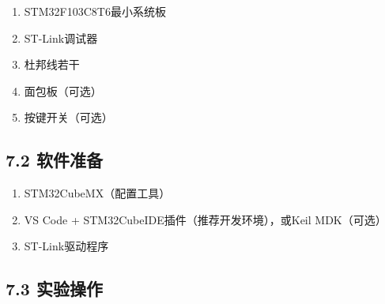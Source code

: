 \documentclass[
  chinese,
  UTF8,
  oneside,
  openany]{ctexbook}
\providecommand{\tightlist}{%
  \setlength{\itemsep}{0pt}\setlength{\parskip}{0pt}}
\begin{document}
\begin{enumerate}
\def\labelenumi{\arabic{enumi}.}
\tightlist
\item
  STM32F103C8T6最小系统板
\item
  ST-Link调试器
\item
  杜邦线若干
\item
  面包板（可选）
\item
  按键开关（可选）
\end{enumerate}

\subsection{7.2 软件准备}\label{ux8f6fux4ef6ux51c6ux5907}

\begin{enumerate}
\def\labelenumi{\arabic{enumi}.}
\tightlist
\item
  STM32CubeMX（配置工具）
\item
  VS Code + STM32CubeIDE插件（推荐开发环境），或Keil MDK（可选）
\item
  ST-Link驱动程序
\end{enumerate}

\subsection{7.3 实验操作}\label{ux5b9eux9a8cux64cdux4f5c}
\end{document}
